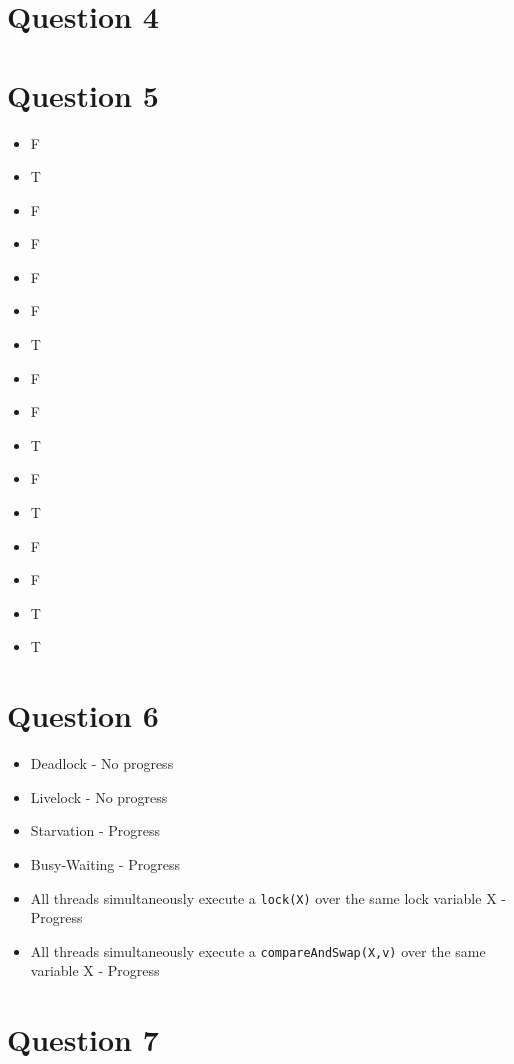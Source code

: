\documentclass[a4paper,twocolumn]{article}
\begin{document}
\section{Question 4}
\section{Question 5}
\begin{itemize}
    \item F
    \item T
    \item F
    \item F
    \item F
    \item F
    \item T
    \item F
    \item F
    \item T
    \item F
    \item T
    \item F
    \item F
    \item T
    \item T
\end{itemize}
\section{Question 6}
\begin{itemize}
    \item Deadlock - No progress
    \item Livelock - No progress
    \item Starvation - Progress
    \item Busy-Waiting - Progress
    \item All threads simultaneously execute a \texttt{lock(X)} over the same lock variable X - Progress
    \item All threads simultaneously execute a \texttt{compareAndSwap(X,v)} over the same variable X - Progress
\end{itemize}
\section{Question 7}
\end{document}
